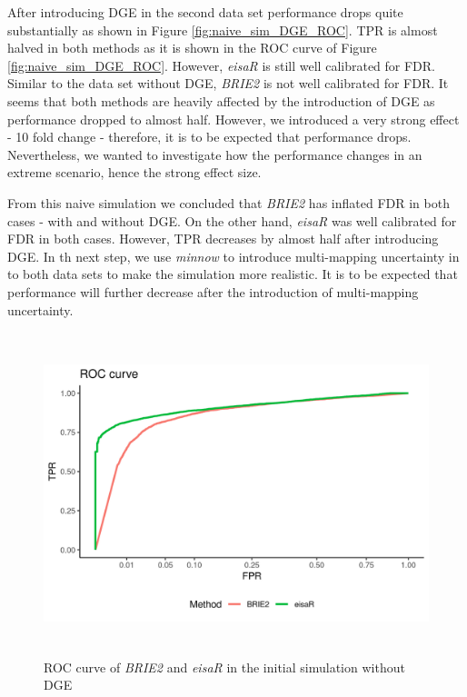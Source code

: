 After introducing DGE in the second data set performance drops quite substantially as shown in Figure \ref{fig:naive_sim_DGE_ROC}. TPR is almost halved in both methods as it is shown in the ROC curve of Figure \ref{fig:naive_sim_DGE_ROC}. However, \emph{eisaR} is still well calibrated for FDR. Similar to the data set without DGE, \emph{BRIE2} is not well calibrated for FDR. It seems that both methods are heavily affected by the introduction of DGE as performance dropped to almost half. However, we introduced a very strong effect - 10 fold change - therefore, it is to be expected that performance drops. Nevertheless, we wanted to investigate how the performance changes in an extreme scenario, hence the strong effect size. 

From this naive simulation we concluded that \emph{BRIE2} has inflated FDR in both cases - with and without DGE. On the other hand, \emph{eisaR} was well calibrated for FDR in both cases. However, TPR decreases by almost half after introducing DGE. In th next step, we use \emph{minnow} to introduce multi-mapping uncertainty in to both data sets to make the simulation more realistic. It is to be expected that performance will further decrease after the introduction of multi-mapping uncertainty.

\begin{figure}[!htb]
\begin{center}
\includegraphics[width=6in,height=3.7in]{../figures/simulation/naive_simulation_ROC.png}
\end{center}
\caption{ROC curve of \emph{BRIE2} and \emph{eisaR} in the initial simulation without DGE}
\label{fig:naive_sim_ROC}
\end{figure}

